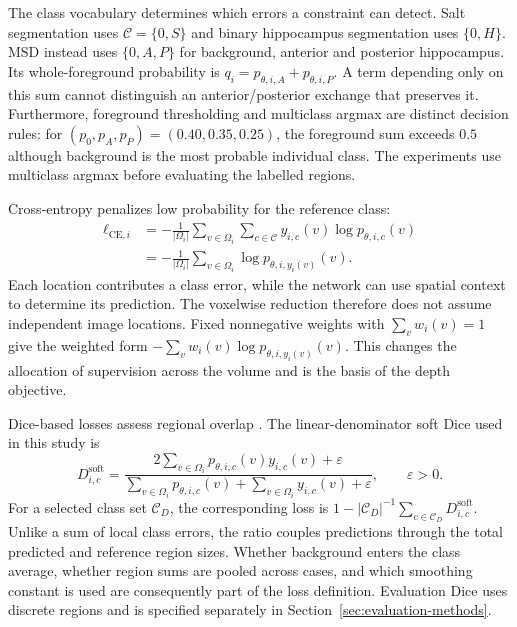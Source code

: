 \documentclass[12pt,a4paper]{article}
\begin{document}
The class vocabulary determines which errors a constraint can detect.
Salt segmentation uses $\mathcal C=\{0,S\}$ and binary hippocampus
segmentation uses $\{0,H\}$. MSD instead uses $\{0,A,P\}$ for background,
anterior and posterior hippocampus. Its whole-foreground probability is
$q_i=p_{\theta,i,A}+p_{\theta,i,P}$. A term depending only on this sum
cannot distinguish an anterior/posterior exchange that preserves it.
Furthermore, foreground thresholding and multiclass argmax are distinct
decision rules: for $(p_0,p_A,p_P)=(0.40,0.35,0.25)$, the foreground sum
exceeds $0.5$ although background is the most probable individual class.
The experiments use multiclass argmax before evaluating the labelled
regions.

Cross-entropy penalizes low probability for the reference class:
\begin{equation}
\begin{aligned}
\ell_{\mathrm{CE},i}
&=-\frac{1}{|\Omega_i|}\sum_{v\in\Omega_i}
  \sum_{c\in\mathcal{C}}y_{i,c}(v)\log p_{\theta,i,c}(v)\\
&=-\frac{1}{|\Omega_i|}\sum_{v\in\Omega_i}
  \log p_{\theta,i,y_i(v)}(v).
\end{aligned}
\label{eq:cross-entropy}
\end{equation}
Each location contributes a class error, while the network can use spatial
context to determine its prediction. The voxelwise reduction therefore
does not assume independent image locations. Fixed nonnegative weights
with $\sum_v w_i(v)=1$ give the weighted form
$-\sum_v w_i(v)\log p_{\theta,i,y_i(v)}(v)$. This changes the allocation
of supervision across the volume and is the basis of the depth objective.

Dice-based losses assess regional overlap \cite{milletari2016vnet}.
The linear-denominator soft Dice used in this study is
\begin{equation}
D_{i,c}^{\mathrm{soft}}=
\frac{2\sum_{v\in\Omega_i}p_{\theta,i,c}(v)y_{i,c}(v)+\varepsilon}
     {\sum_{v\in\Omega_i}p_{\theta,i,c}(v)
      +\sum_{v\in\Omega_i}y_{i,c}(v)+\varepsilon},
\qquad \varepsilon>0.
\label{eq:soft-dice}
\end{equation}
For a selected class set $\mathcal C_D$, the corresponding loss is
$1-|\mathcal C_D|^{-1}\sum_{c\in\mathcal C_D}D^{\mathrm{soft}}_{i,c}$.
Unlike a sum of local class errors, the ratio couples predictions through
the total predicted and reference region sizes. Whether background enters
the class average, whether region sums are pooled across cases, and which
smoothing constant is used are consequently part of the loss definition.
Evaluation Dice uses discrete regions and is specified separately in
Section~\ref{sec:evaluation-methods}.
\end{document}
